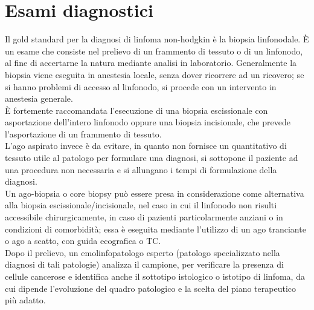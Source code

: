 \section{Esami diagnostici}
Il gold standard per la diagnosi di linfoma non-hodgkin è la biopsia linfonodale. 
È un esame che consiste nel prelievo di un frammento di tessuto o di un linfonodo, al fine di 
accertarne la natura mediante analisi in laboratorio. 
Generalmente la biopsia viene eseguita in anestesia locale, senza dover ricorrere ad un ricovero; 
se si hanno problemi di accesso al linfonodo, si procede con un intervento in anestesia generale\cite{ISS}.\\
È fortemente raccomandata l’esecuzione di una biopsia escissionale con asportazione dell’intero linfonodo 
oppure una biopsia incisionale, che prevede l’asportazione di un frammento di tessuto\cite{AMERICANCANCER}.\\ 
L’ago aspirato invece è da evitare, in quanto non fornisce un quantitativo di tessuto utile al patologo per formulare 
una diagnosi, si sottopone il paziente ad una procedura non necessaria e si allungano i tempi di formulazione 
della diagnosi\cite{reteveneta}.\\
Un ago-biopsia o core biopsy può essere presa in considerazione come alternativa alla biopsia escissionale/incisionale,
nel caso in cui il linfonodo non risulti accessibile chirurgicamente, in caso di pazienti particolarmente anziani o in 
condizioni di comorbidità; essa è eseguita mediante l’utilizzo di un ago tranciante o ago a scatto, con guida 
ecografica o TC\cite{reteveneta}.\\
Dopo il prelievo, un emolinfopatologo esperto (patologo specializzato nella diagnosi di tali patologie) analizza 
il campione, per verificare la presenza di cellule cancerose e identifica anche il sottotipo 
istologico o istotipo di linfoma, da cui dipende l’evoluzione del quadro patologico e la scelta del piano 
terapeutico più adatto\cite{LLS}.\\


